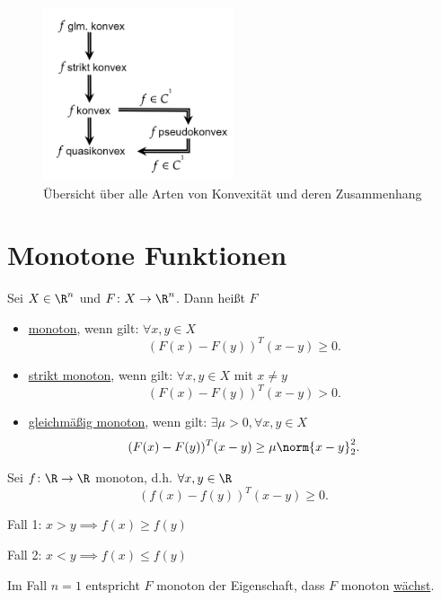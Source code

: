 \begin{figure}[ht!]
	\begin{center}
		\includegraphics[width=0.5\textwidth]{pics/texplot4.png}
	\end{center}
	\caption{Übersicht über alle Arten von Konvexität und deren Zusammenhang}
	\label{fig:übersichtkonvex}
\end{figure}

\section{Monotone Funktionen}%
\label{sec:Monotone Funktionen}

\begin{definition}
\label{thm:monotonefunktionen}
	Sei $X \in \R^{n}$ und $F \colon X \rightarrow \R^{n}$. Dann heißt $F$
	\begin{itemize}
		\item \underline{monoton}, wenn gilt: $\forall x,y \in X$
			\[
				\left( F(x) - F(y) \right)^{T}(x-y) \geq 0	
			.\] 
		\item \underline{strikt monoton}, wenn gilt: $\forall x,y \in X$ mit $x \neq y$
			\[
				( F(x) - F(y) )^{T}(x-y) > 0	
			.\] 
		\item \underline{gleichmäßig monoton}, wenn gilt: $\exists \mu > 0, \forall x, y \in X$
			\[
				( F(x) - F(y) )^{T}(x-y) \geq \mu \norm{x-y} _{2}^{2}
			.\] 
	\end{itemize}
\end{definition}

\begin{beispiel}
\label{thm:beispielmonotonefunktionen1}
	Sei $f \colon \R \rightarrow \R $ monoton, d.h. $\forall x,y \in \R $
	\[
		(f(x)-f(y))^{T}(x-y) \geq 0
	.\]
	\begin{center}
			Fall 1: $x > y \implies f(x) \geq f(y)$

			Fall 2: $x < y \implies f(x) \leq f(y)$
	\end{center}

	Im Fall $n=1$ entspricht $F$ monoton der Eigenschaft, dass $F$ monoton \underline{wächst}.
\end{beispiel}

